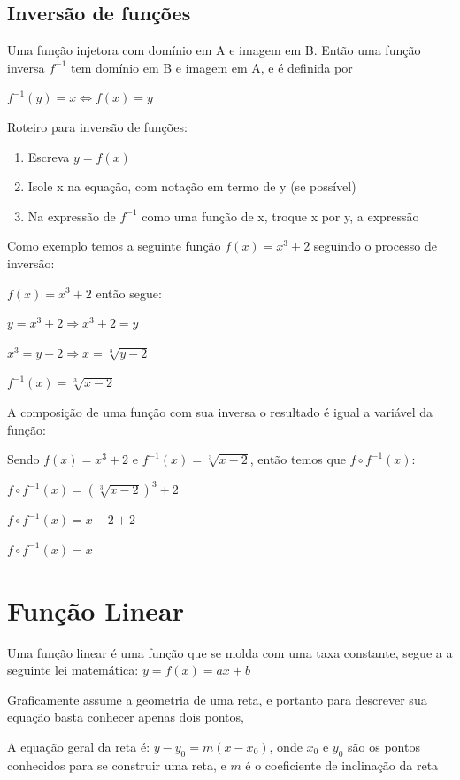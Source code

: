 \begin{multicols*}{2}
    \subsection{Inversão de funções}
    \begin{theorem}
        Uma função injetora com domínio em A e imagem em B. Então uma função inversa $f^{-1}$ tem 				domínio em B e imagem em A, e é definida por

        $f^{-1}(y) = x \Leftrightarrow f(x) = y$
    \end{theorem}

    Roteiro para inversão de funções:

    \begin{enumerate}
        \item Escreva $y = f(x)$
        \item Isole x na equação, com notação em termo de y (se possível)
        \item Na expressão de $f^{-1}$ como uma função de x, troque x por y, a expressão
    \end{enumerate}

    Como exemplo temos a seguinte função  $f(x) = x^3 +2$ seguindo o processo de 					inversão:

    $f(x) =x^3+2$ então segue:

    $y = x^3 +2 \Rightarrow x^3 +2 = y $

    $x^3 = y - 2 \Rightarrow x = \sqrt[3]{y - 2}$

    $f^{-1}(x) = \sqrt[3]{x - 2}$

    A composição de uma função com sua inversa o resultado é igual a variável da função:

    Sendo $f(x) = x^3 +2$ e $f^{-1}(x) = \sqrt[3]{x - 2}$, então temos que $f \circ f^{-1}(x)$:

    $f \circ f^{-1}(x) = (\sqrt[3]{x - 2})^3 +2$

    $f \circ f^{-1}(x) = x -2 +2$

    $f \circ f^{-1}(x) = x$
    \section{ Função Linear}
    Uma função linear é uma função que se molda com uma taxa constante, segue a a seguinte lei 				matemática: $y = f(x) = ax + b$

    Graficamente assume a geometria de uma reta, e portanto para descrever sua equação basta 				conhecer apenas dois pontos,

    A equação geral da reta é: $y - y_0 = m(x-x_0)$, onde $x_0$ e $y_0$ são os pontos conhecidos 			para se construir uma reta, e $m$ é o coeficiente de inclinação da reta


\end{multicols*}
